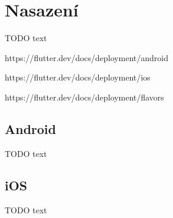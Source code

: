 \chapter{Nasazení}

TODO text

https://flutter.dev/docs/deployment/android

https://flutter.dev/docs/deployment/ios

https://flutter.dev/docs/deployment/flavors

\section{Android}

TODO text

\section{iOS}

TODO text
